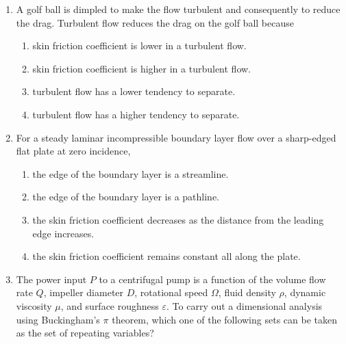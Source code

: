 \documentclass[journal,12pt,onecolumn]{IEEEtran}
\begin{document}
\begin{enumerate}[label=\arabic*)]
\vspace{0.5cm}

\item A golf ball is dimpled to make the flow turbulent and consequently to reduce the drag. Turbulent flow reduces the drag on the golf ball because
\hfill{} \\

\vspace{0.2cm}
\begin{enumerate}[label=\alph*))]
\item skin friction coefficient is lower in a turbulent flow.
\item skin friction coefficient is higher in a turbulent flow.
\item turbulent flow has a lower tendency to separate.
\item turbulent flow has a higher tendency to separate.
\end{enumerate}

\vspace{0.5cm}

\item For a steady laminar incompressible boundary layer flow over a sharp-edged flat plate at zero incidence,
\hfill{} \\

\vspace{0.2cm}
\begin{enumerate}[label=\alph*)]
\item the edge of the boundary layer is a streamline.
\item the edge of the boundary layer is a pathline.
\item the skin friction coefficient decreases as the distance from the leading edge increases.
\item the skin friction coefficient remains constant all along the plate.
\end{enumerate}

\vspace{0.5cm}

\item The power input $P$ to a centrifugal pump is a function of the volume flow rate $Q$, impeller diameter $D$, rotational speed $\Omega$, fluid density $\rho$, dynamic viscosity $\mu$, and surface roughness $\varepsilon$. To carry out a dimensional analysis using Buckingham’s $\pi$ theorem, which one of the following sets can be taken as the set of repeating variables?
\hfill{} \\


\end{enumerate}
\end{document}
